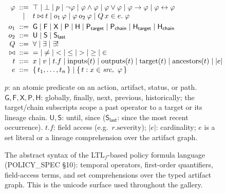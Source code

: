 \begin{figure}[H]
\centering
\small
\[
\begin{array}{r@{\;\;}c@{\;\;}l}
\varphi & ::= & \top \mid \bot \mid p \mid \lnot\varphi \mid \varphi \land \varphi \mid \varphi \lor \varphi \mid \varphi \rightarrow \varphi \mid \varphi \leftrightarrow \varphi \\
        & \mid & t \bowtie t \mid o_1\,\varphi \mid \varphi \mathbin{o_2} \varphi \mid Q\,x \in e.\;\varphi \\[3pt]
o_1 & ::= & \mathsf{G} \mid \mathsf{F} \mid \mathsf{X} \mid \mathsf{P} \mid \mathsf{H} \mid \mathsf{P}_{\mathsf{target}} \mid \mathsf{P}_{\mathsf{chain}} \mid \mathsf{H}_{\mathsf{target}} \mid \mathsf{H}_{\mathsf{chain}} \\
o_2 & ::= & \mathsf{U} \mid \mathsf{S} \mid \mathsf{S}_{\mathsf{last}} \\
Q & ::= & \forall \mid \exists \mid \exists! \\
{\bowtie} & ::= & {=} \mid {\neq} \mid {<} \mid {\leq} \mid {>} \mid {\geq} \mid {\in} \\
t & ::= & x \mid v \mid t.f \mid \mathrm{inputs}(t) \mid \mathrm{outputs}(t) \mid \mathrm{target}(t) \mid \mathrm{ancestors}(t) \mid \lvert e\rvert \\
e & ::= & \{\, t_1,\ldots,t_n \,\} \mid \{\, t : x \in \mathit{src},\ \varphi \,\}
\end{array}
\]
\vspace{-2pt}
\begin{minipage}{\linewidth}
{\footnotesize $p$: an atomic predicate on an action, artifact, status, or path. $\mathsf{G},\mathsf{F},\mathsf{X},\mathsf{P},\mathsf{H}$: globally, finally, next, previous, historically; the \textsf{target}/\textsf{chain} subscripts scope a past operator to a target or its lineage chain. $\mathsf{U},\mathsf{S}$: until, since ($\mathsf{S}_{\mathsf{last}}$: since the most recent occurrence). $t.f$: field access (e.g.\ $r.\mathrm{severity}$); $\lvert e\rvert$: cardinality; $e$ is a set literal or a lineage comprehension over the artifact graph.\par}
\end{minipage}
\caption{The abstract syntax of the \textrm{LTL}$_f$-based policy formula language (POLICY\_SPEC \S10): temporal operators, first-order quantifiers, field-access terms, and set comprehensions over the typed artifact graph. This is the unicode surface used throughout the gallery.}
\label{fig:pol-grammar}
\end{figure}

